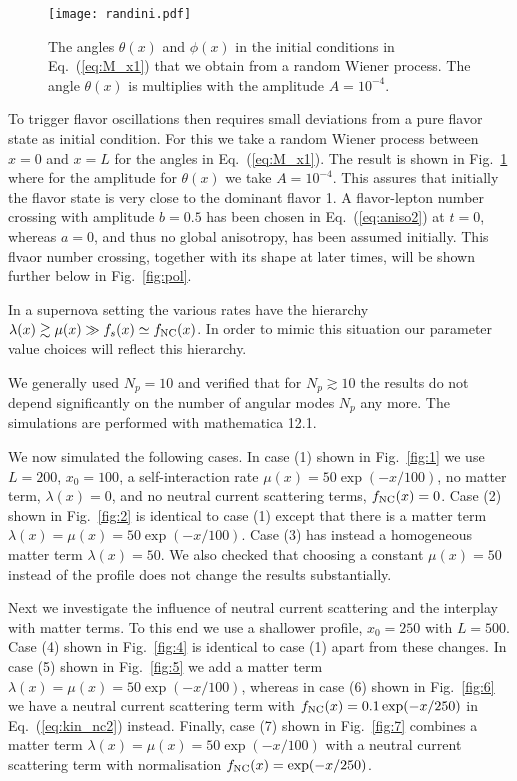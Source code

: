\documentclass[prd,aps]{revtex4-2}
\begin{document}
\begin{figure}[p]
\texttt{[image: randini.pdf]}
\caption[...]{The angles $\theta(x)$ and $\phi(x)$ in the initial conditions in Eq.~(\ref{eq:M_x1}) that we obtain from a random
Wiener process. The angle $\theta(x)$ is multiplies with the amplitude $A=10^{-4}$.}
\label{fig:randini}
\end{figure}

To trigger flavor oscillations then requires small deviations from a pure flavor state as initial condition. For this we take
a random Wiener process between $x=0$ and $x=L$ for the angles in Eq.~(\ref{eq:M_x1}). The result is shown in Fig.~\ref{fig:randini}
where for the amplitude for $\theta(x)$ we take $A=10^{-4}$. This assures that initially the flavor state is very close
to the dominant flavor 1. A flavor-lepton number crossing with amplitude $b=0.5$ has been
chosen in Eq.~(\ref{eq:aniso2}) at $t=0$, whereas $a=0$, and thus no global anisotropy, has been assumed initially.
This flvaor number crossing, together with its shape at later times, will be shown further below in Fig.~\ref{fig:pol}.

In a supernova setting the various rates have the hierarchy $\lambda(x)\gtrsim\mu(x)\gg f_s(x)\simeq f_{\rm NC}(x)$.
In order to mimic this situation our parameter value choices will reflect this hierarchy.

We generally used $N_p=10$ and verified that for $N_p\gtrsim10$ the results do not depend significantly on the number of angular
modes $N_p$ any more. The simulations are performed with mathematica 12.1.

We now simulated the following cases. In case (1) shown in Fig.~\ref{fig:1} we use $L=200$, $x_0=100$, a self-interaction
rate $\mu(x)=50\exp(-x/100)$,
no matter term, $\lambda(x)=0$, and no neutral current scattering terms, $f_{\rm NC}(x)=0$. Case (2) shown in Fig.~\ref{fig:2}
is identical to case (1) except that there is a matter term $\lambda(x)=\mu(x)=50\exp(-x/100)$. Case (3) has instead a
homogeneous matter term $\lambda(x)=50$. We also checked that choosing a constant $\mu(x)=50$ instead of the profile
does not change the results substantially.

Next we investigate the influence of neutral current scattering and the interplay with matter terms. To this end
we use a shallower profile, $x_0=250$ with $L=500$. Case (4) shown in Fig.~\ref{fig:4} is identical to case (1)
apart from these changes. In case (5) shown in Fig.~\ref{fig:5} we add a matter term $\lambda(x)=\mu(x)=50\exp(-x/100)$,
whereas in case (6) shown in Fig.~\ref{fig:6} we have a neutral current scattering term with
$f_{\rm NC}(x)=0.1\exp(-x/250)$ in Eq.~(\ref{eq:kin_nc2}) instead. 
Finally, case (7) shown in Fig.~\ref{fig:7} combines a matter term $\lambda(x)=\mu(x)=50\exp(-x/100)$ with a
neutral current scattering term with normalisation $f_{\rm NC}(x)=\exp(-x/250)$.
\end{document}
